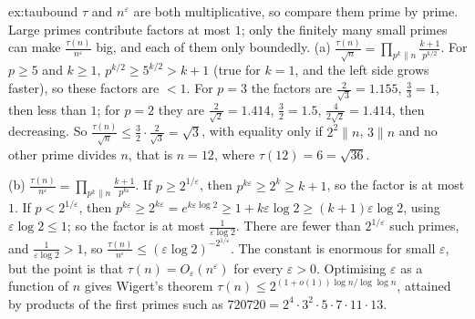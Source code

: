 \begin{solution}{ex:taubound}
\idea $\tau$ and $n^\varepsilon$ are both multiplicative, so compare them prime by prime. Large primes contribute factors at most $1$; only the
finitely many small primes can make $\frac{\tau(n)}{n^\varepsilon}$ big, and each of them only boundedly.
\writeup (a) $\frac{\tau(n)}{\sqrt n}=\prod_{p^k\|n}\frac{k+1}{p^{k/2}}$. For $p\ge5$ and $k\ge1$, $p^{k/2}\ge5^{k/2}>k+1$ (true for $k=1$, and the left side grows faster), so
these factors are $<1$. For $p=3$ the factors are $\frac2{\sqrt3}=1.155$, $\frac33=1$, then less than $1$; for $p=2$ they are $\frac2{\sqrt2}=1.414$,
$\frac32=1.5$, $\frac4{2\sqrt2}=1.414$, then decreasing. So $\frac{\tau(n)}{\sqrt n}\le\frac32\cdot\frac2{\sqrt3}=\sqrt3$, with equality only if $2^2\|n$, $3\|n$ and no other prime
divides $n$, that is $n=12$, where $\tau(12)=6=\sqrt{36}$.

(b) $\frac{\tau(n)}{n^\varepsilon}=\prod_{p^k\|n}\frac{k+1}{p^{k\varepsilon}}$. If $p\ge2^{1/\varepsilon}$, then $p^{k\varepsilon}\ge2^k\ge k+1$, so the factor is at most $1$. If $p<2^{1/\varepsilon}$, then
$p^{k\varepsilon}\ge2^{k\varepsilon}=e^{k\varepsilon\log2}\ge1+k\varepsilon\log2\ge(k+1)\varepsilon\log2$, using $\varepsilon\log2\le1$; so the factor is at most $\frac1{\varepsilon\log2}$. There are fewer
than $2^{1/\varepsilon}$ such primes, and $\frac1{\varepsilon\log2}>1$, so $\frac{\tau(n)}{n^\varepsilon}\le(\varepsilon\log2)^{-2^{1/\varepsilon}}$. The constant is enormous for small $\varepsilon$, but
the point is that $\tau(n)=O_\varepsilon(n^\varepsilon)$ for every $\varepsilon>0$. Optimising $\varepsilon$ as a function of $n$ gives Wigert's theorem
$\tau(n)\le2^{(1+o(1))\log n/\log\log n}$, attained by products of the first primes such as $720720=2^4\cdot3^2\cdot5\cdot7\cdot11\cdot13$.
\end{solution}

